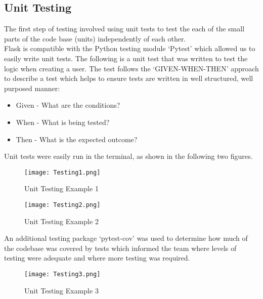 \documentclass[11pt, english]{article}
\begin{document}
	\subsection{Unit Testing}

The first step of testing involved using unit tests to test the each of the small parts of the code base (units) independently of each other.\\

Flask is compatible with the Python testing module `Pytest' which allowed us to easily write unit tests. The following is a unit test that was written to test the logic when creating a user. The test follows the `GIVEN-WHEN-THEN' approach to describe a test which helps to ensure tests are written in well structured, well purposed manner:
		
	\begin{itemize}
	\setlength\itemsep{0cm}
		\item Given - What are the conditions?
		\item When - What is being tested?
		\item Then - What is the expected outcome?
	\end{itemize}

	Unit tests were easily run in the terminal, as shown in the following two figures.

	\begin{figure}[H]
	\begin{center}
		\texttt{[image: Testing1.png]}
		\caption{Unit Testing Example 1}
	\end{center}
	\end{figure}

	\begin{figure}[H]
	\begin{center}
		\texttt{[image: Testing2.png]}
		\caption{Unit Testing Example 2}
	\end{center}
	\end{figure}

	An additional testing package `pytest-cov' was used to determine how much of the codebase was covered by tests which informed the team where levels of testing were adequate and where more testing was required.

	\begin{figure}[H]
	\begin{center}
		\texttt{[image: Testing3.png]}
		\caption{Unit Testing Example 3}
	\end{center}
	\end{figure}
\end{document}
